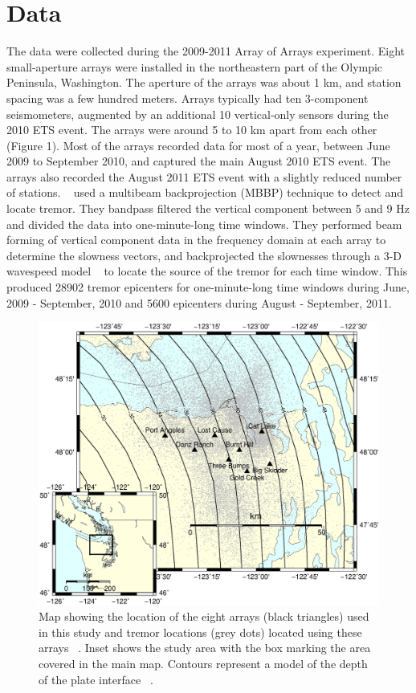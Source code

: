 \documentclass[draft]{agujournal2019}
\begin{document}
\section{Data}

The data were collected during the 2009-2011 Array of Arrays experiment. Eight small-aperture arrays were installed in the northeastern part of the Olympic Peninsula, Washington. The aperture of the arrays was about 1 km, and station spacing was a few hundred meters. Arrays typically had ten 3-component seismometers, augmented by an additional 10 vertical-only sensors during the 2010 ETS event.  The arrays were around 5 to 10 km apart from each other (Figure 1). Most of the arrays recorded data  for most of  a year, between June 2009 to September 2010, and captured the main August 2010 ETS event. The arrays also recorded the August 2011 ETS event with a slightly reduced number of stations. ~ used a multibeam backprojection (MBBP) technique to detect and locate tremor. They bandpass filtered the vertical component between 5 and 9 Hz and divided the data into one-minute-long time windows. They performed beam forming of vertical component data in the frequency domain at each array to determine the slowness vectors, and backprojected the slownesses through a 3-D wavespeed model ~\cite{PRE_2003} to locate the source of the tremor for each time window. This produced 28902 tremor epicenters for one-minute-long time windows during June, 2009 - September, 2010 and 5600 epicenters during August - September, 2011.

\begin{figure}
\noindent\includegraphics[width=\textwidth, trim={0cm 2.5cm 0cm 9.5cm},clip]{figures/arrays_location.eps}
\caption{Map showing the location of the eight arrays (black triangles) used in this study and tremor locations (grey dots) located using these arrays ~\cite{GHO_2012}. Inset shows the study area with the box marking the area covered in the main map. Contours represent a model of the depth of the plate interface ~\cite{MCC_2006}.}
\label{pngfiguresample}
\end{figure}
\end{document}
